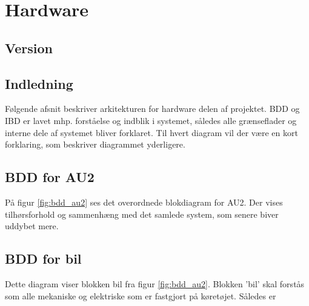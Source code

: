 \section{Hardware}

\subsection{Version}

\subsection{Indledning}
Følgende afsnit beskriver arkitekturen for hardware delen af projektet. BDD og IBD er lavet mhp. forståelse og indblik i systemet, således alle grænseflader og interne dele af systemet bliver forklaret. Til hvert diagram vil der være en kort forklaring, som beskriver diagrammet yderligere.

\subsection{BDD for AU2}	%

På figur \ref{fig:bdd_au2} ses det overordnede blokdiagram for AU2. Der vises tilhørsforhold og sammenhæng med det samlede system, som senere biver uddybet mere.


\subsection{BDD for bil} %

Dette diagram viser blokken bil fra figur \ref{fig:bdd_au2}. Blokken 'bil' skal forstås som alle mekaniske og elektriske som er fastgjort på køretøjet. Således er 


\subpsection{}


